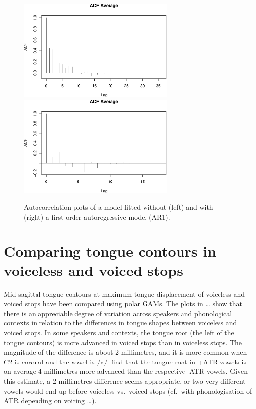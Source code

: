 \documentclass[12pt,]{article}
\begin{document}
\begin{figure}

{\centering \includegraphics[width=.7\linewidth,height=5cm]{2018-polar-gam_files/figure-latex/it01-acf-1} \includegraphics[width=.7\linewidth,height=5cm]{2018-polar-gam_files/figure-latex/it01-acf-2} 

}

\caption{Autocorrelation plots of a model fitted without (left) and with (right) a first-order autoregressive model (AR1).}\label{f:it01-acf}
\end{figure}

\hypertarget{comparing-tongue-contours-in-voiceless-and-voiced-stops}{%
\section{Comparing tongue contours in voiceless and voiced
stops}\label{comparing-tongue-contours-in-voiceless-and-voiced-stops}}

Mid-sagittal tongue contours at maximum tongue displacement of voiceless
and voiced stops have been compared using polar GAMs. The plots in
\ldots{} show that there is an appreciable degree of variation across
speakers and phonological contexts in relation to the differences in
tongue shapes between voiceless and voiced stops. In some speakers and
contexts, the tongue root (the left of the tongue contours) is more
advanced in voiced stops than in voiceless stops. The magnitude of the
difference is about 2 millimetres, and it is more common when C2 is
coronal and the vowel is /a/. \citet{kirkham2017} find that the tongue
root in +ATR vowels is on average 4 millimetres more advanced than the
respective -ATR vowels. Given this estimate, a 2 millimetres difference
seems appropriate, or two very different vowels would end up before
voiceless vs.~voiced stops (cf.~with phonologisation of ATR depending on
voicing \ldots{}).
\end{document}

